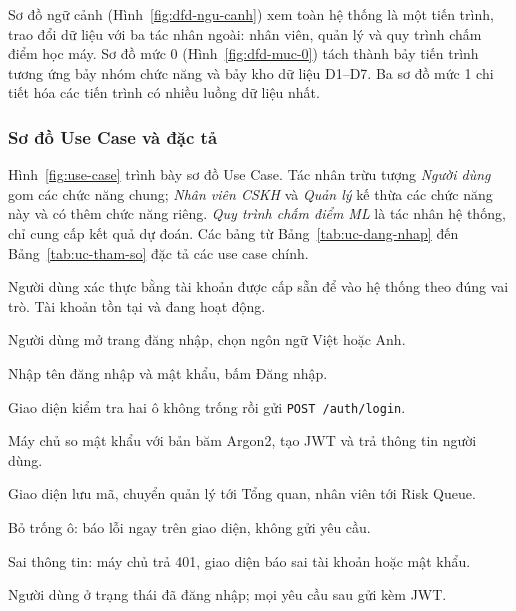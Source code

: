 Sơ đồ ngữ cảnh (Hình~\ref{fig:dfd-ngu-canh}) xem toàn hệ thống là một tiến trình, trao đổi dữ liệu
với ba tác nhân ngoài: nhân viên, quản lý và quy trình chấm điểm học máy. Sơ đồ mức 0
(Hình~\ref{fig:dfd-muc-0}) tách thành bảy tiến trình tương ứng bảy nhóm chức năng và bảy kho dữ liệu
D1--D7. Ba sơ đồ mức 1 chi tiết hóa các tiến trình có nhiều luồng dữ liệu nhất.


\subsubsection{Sơ đồ Use Case và đặc tả}

Hình~\ref{fig:use-case} trình bày sơ đồ Use Case. Tác nhân trừu tượng \textit{Người dùng} gom các
chức năng chung; \textit{Nhân viên CSKH} và \textit{Quản lý} kế thừa các chức năng này và có thêm
chức năng riêng. \textit{Quy trình chấm điểm ML} là tác nhân hệ thống, chỉ cung cấp kết quả dự đoán.
Các bảng từ Bảng~\ref{tab:uc-dang-nhap} đến Bảng~\ref{tab:uc-tham-so} đặc tả các use case chính.


{Người dùng xác thực bằng tài khoản được cấp sẵn để vào hệ thống theo đúng vai trò.}
{Tài khoản tồn tại và đang hoạt động.}
{\item Người dùng mở trang đăng nhập, chọn ngôn ngữ Việt hoặc Anh.
 \item Nhập tên đăng nhập và mật khẩu, bấm Đăng nhập.
 \item Giao diện kiểm tra hai ô không trống rồi gửi \texttt{POST /auth/login}.
 \item Máy chủ so mật khẩu với bản băm Argon2, tạo JWT và trả thông tin người dùng.
 \item Giao diện lưu mã, chuyển quản lý tới Tổng quan, nhân viên tới Risk Queue.}
{\item Bỏ trống ô: báo lỗi ngay trên giao diện, không gửi yêu cầu.
 \item Sai thông tin: máy chủ trả 401, giao diện báo sai tài khoản hoặc mật khẩu.}
{Người dùng ở trạng thái đã đăng nhập; mọi yêu cầu sau gửi kèm JWT.}

